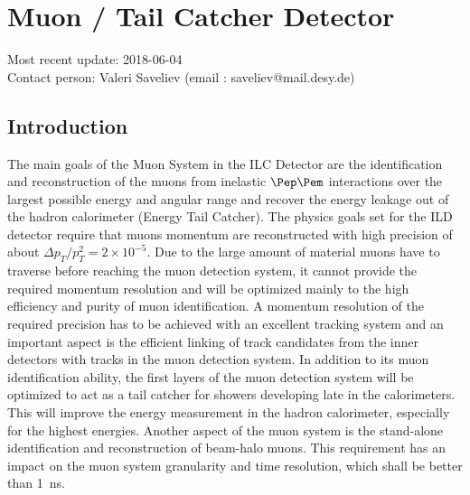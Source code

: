 \section{Muon / Tail Catcher Detector}
Most recent update: 2018-06-04 \\
Contact person: Valeri Saveliev (email : saveliev@mail.desy.de)

\subsection{Introduction}
The main goals of the Muon System in the ILC Detector are the identification and reconstruction of the muons from inelastic $\Pep\Pem$ interactions over the largest possible energy and angular range and recover the energy leakage out of the hadron calorimeter (Energy Tail Catcher).
The physics goals set for the ILD detector require that muons momentum are reconstructed with high precision of about $\Delta p_T/p^2_T = 2 \times10^{-5}$.
Due to the large amount of material muons have to traverse before reaching the muon detection system, it cannot provide the required momentum resolution and will be optimized mainly to the high efficiency and purity of muon identification.
A momentum resolution of the required precision has to be achieved with an excellent tracking system and an important aspect is the efficient linking of track candidates from the inner detectors with tracks in the muon detection system.
In addition to its muon identification ability, the first layers of the muon detection system will be optimized to act as a tail catcher for showers developing late in the calorimeters. This will improve the energy measurement in the hadron calorimeter, especially for the highest energies.
Another aspect of the muon system is the stand-alone identification and reconstruction of beam-halo muons. This requirement has an impact on the muon system granularity and time resolution, which shall be better than \SI{1}{ns}.

